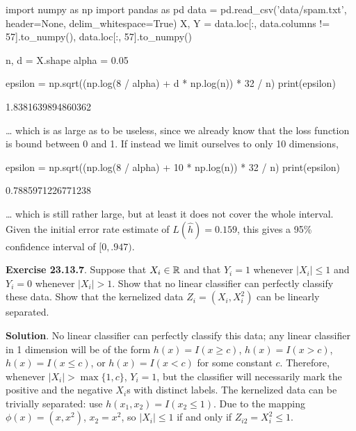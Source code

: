 \begin{python}
import numpy as np
import pandas as pd
data = pd.read_csv('data/spam.txt', header=None, delim_whitespace=True)
X, Y = data.loc[:, data.columns != 57].to_numpy(), data.loc[:, 57].to_numpy()
\end{python}

\begin{python}
n, d = X.shape
alpha = 0.05
\end{python}

\begin{python}
epsilon = np.sqrt((np.log(8 / alpha) + d * np.log(n)) * 32 / n)
print(epsilon)
\end{python}
\begin{console}
1.8381639894860362
\end{console}
\ldots{} which is as large as to be useless, since we already know that
the loss function is bound between 0 and 1.
If instead we limit ourselves to only 10 dimensions,

\begin{python}
epsilon = np.sqrt((np.log(8 / alpha) + 10 * np.log(n)) * 32 / n)
print(epsilon)
\end{python}
\begin{console}
0.7885971226771238
\end{console}
\ldots{} which is still rather large, but at least it does not cover the
whole interval. Given the initial error rate estimate of
\(L(\hat{h}) = 0.159\), this gives a 95\% confidence interval of
\([0, .947)\).

\textbf{Exercise 23.13.7}. Suppose that \(X_{i} \in \mathbb{R}\) and that
\(Y_{i} = 1\) whenever \(|X_{i}| \leq 1\) and \(Y_{i} = 0\) whenever
\(|X_{i}| > 1\). Show that no linear classifier can perfectly classify
these data. Show that the kernelized data \(Z_{i} = (X_{i}, X_{i}^{2})\) can be
linearly separated.

\textbf{Solution}. No linear classifier can perfectly classify this
data; any linear classifier in 1 dimension will be of the form
\(h(x) = I(x \geq c)\), \(h(x) = I(x > c)\), \(h(x) = I(x \leq c)\), or
\(h(x) = I(x < c)\) for some constant \(c\). Therefore, whenever
\(|X_{i}| > \max \{ 1, c \}\), \(Y_{i} = 1\), but the classifier will
necessarily mark the positive and the negative \(X_{i}\)s with distinct
labels.
The kernelized data can be trivially separated: use
\(h(x_{1}, x_{2}) = I(x_{2} \leq 1)\). Due to the mapping
\(\phi(x) = (x, x^{2})\), \(x_{2} = x^{2}\), so \(|X_{i}| \leq 1\) if and only
if \(Z_{i2} = X_{i}^{2} \leq 1\).

